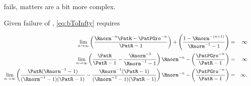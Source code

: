 \documentclass[./BufferStockTheory.tex]{subfiles}
\begin{document}
fails, matters are a bit more complex.
\begin{comment}
As noted in the main text, the Finite Value Requirement for such a consumer
requires $\PatPGro < (\Rfree/\PGro)^{1/\CRRA}$,\footnote{A
  unique well-defined nondegenerate limiting consumption function can
  actually exist even if a nondegenerate value function does not.  But
  the parametric combinations required for this are somewhat peculiar
  (including both $\Rfree < 1$ and $\PGro < 1$); but we restrict our attention
  to the more useful and plausible cases with finite value.} which is stronger (holds
in strictly fewer circumstances) than the \GICRaw~condition $\PatPGro < 1$.
Thus, the \GICRaw~is an implication of \cncl{\FHWC}.
\end{comment}
Given failure of \FHWC, \eqref{eq:bToInfty} requires

\begin{eqnarray}
  \lim_{n \rightarrow \infty} \left(\frac{\Rnorm^{-n}\PatR-\PatPGro^{-n}}{\PatR-1}\right) + \left(\frac{1-\Rnorm^{-(n+1)}}{\Rnorm^{-1}-1}\right) & = & \infty \notag
\\   \lim_{n \rightarrow \infty} \left(\frac{\PatR}{\PatR-1}-\frac{\Rnorm^{-1}}{\Rnorm^{-1}-1}\right)\Rnorm^{-n}-\left(\frac{\PatPGro^{-n}}{\PatR-1}\right) & = & \infty \notag
\\   \lim_{n \rightarrow \infty} \left(\frac{\PatR(\Rnorm^{-1}-1)}{(\Rnorm^{-1}-1)(\PatR-1)}-\frac{\Rnorm^{-1}(\PatR-1)}{(\Rnorm^{-1}-1)(\PatR-1)}\right)\Rnorm^{-n}-\left(\frac{\PatPGro^{-n}}{\PatR-1}\right) & = & \infty. \label{eq:FHWCfails}
\end{eqnarray}
\end{document}
